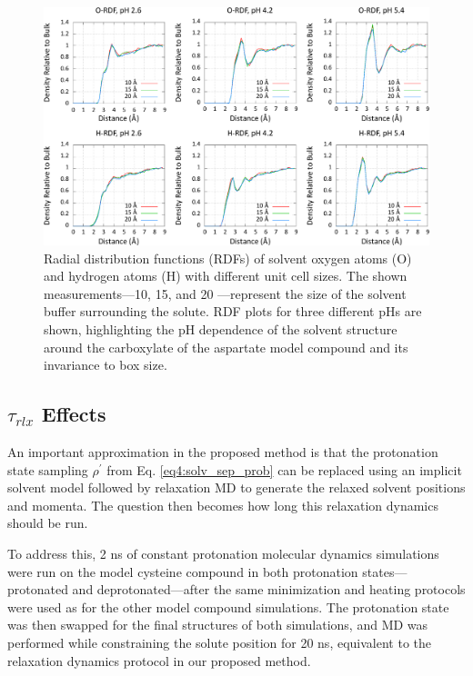 \begin{figure}
   \includegraphics[width=6.5in]{model_AS4_RDF_box.eps}
   \caption{Radial distribution functions (RDFs) of solvent oxygen atoms (O) and
            hydrogen atoms (H) with different unit cell sizes. The shown
            measurements---10, 15, and 20 \text{\AA}---represent the size of the
            solvent buffer surrounding the solute. RDF plots for three different
            pHs are shown, highlighting the pH dependence of the solvent
            structure around the carboxylate of the aspartate model compound and
            its invariance to box size.}
   \label{fig4:ref_rdf}
\end{figure}

\subsection{$\tau _ {rlx}$ Effects}

An important approximation in the proposed method is that the protonation state
sampling $\rho^\prime$ from Eq. \ref{eq4:solv_sep_prob} can be replaced using an
implicit solvent model followed by relaxation MD to generate the relaxed solvent
positions and momenta. The question then becomes how long this relaxation
dynamics should be run.

To address this, 2 ns of constant protonation molecular dynamics simulations
were run on the model cysteine compound in both protonation states---protonated
and deprotonated---after the same minimization and heating protocols were used
as for the other model compound simulations. The protonation state was then
swapped for the final structures of both simulations, and MD was performed while
constraining the solute position for 20 ns, equivalent to the relaxation
dynamics protocol in our proposed method.


